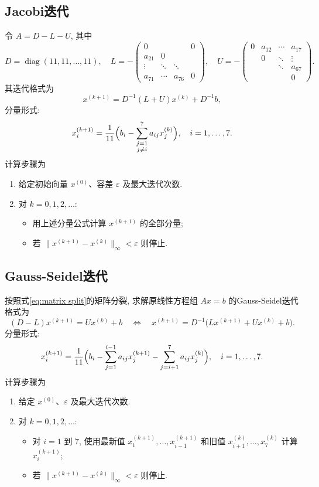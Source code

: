 \documentclass[12pt,a4paper]{ctexart}
\begin{document}
\subsection{Jacobi迭代}
令 $A = D - L - U$, 其中
\begin{equation}\label{eq:matrix split}
    D = \operatorname{diag}(11,11,\dots,11),\quad
    L = -\begin{pmatrix}
    0 &  &  & 0\\
    a_{21} & 0 &  & \\
    \vdots & \ddots & \ddots & \\
    a_{71} & \cdots & a_{76} & 0
    \end{pmatrix},\quad
    U = -\begin{pmatrix}
    0 & a_{12} & \cdots & a_{17}\\
    & 0 & \ddots & \vdots\\
    & & \ddots & a_{67}\\
    & & & 0
\end{pmatrix}.
\end{equation}
其迭代格式为\[
x^{(k+1)} = D^{-1}(L+U)x^{(k)} + D^{-1}b,
\]
分量形式: 
\[
x_i^{(k+1)} = \frac{1}{11}\Bigl(b_i - \sum_{\substack{j=1\\ j\neq i}}^{7} a_{ij}x_j^{(k)}\Bigr), \quad i=1,\dots,7.
\]
计算步骤为\begin{enumerate}
\item 给定初始向量 $x^{(0)}$、容差 $\varepsilon$ 及最大迭代次数. 
\item 对 $k=0,1,2,\dots$: 
   \begin{itemize}
   \item 用上述分量公式计算 $x^{(k+1)}$ 的全部分量; 
   \item 若 $\|x^{(k+1)}-x^{(k)}\|_\infty<\varepsilon$ 则停止. 
   \end{itemize}
\end{enumerate}

\subsection{Gauss-Seidel迭代}
按照式\eqref{eq:matrix split}的矩阵分裂, 求解原线性方程组 $Ax=b$ 的Gauss-Seidel迭代格式为
\[
(D-L)x^{(k+1)} = Ux^{(k)} + b \quad\Longleftrightarrow\quad
x^{(k+1)} = D^{-1}\bigl(L x^{(k+1)} + U x^{(k)} + b\bigr).
\]
分量形式: 
\[
x_i^{(k+1)} = \frac{1}{11}\Bigl(b_i - \sum_{j=1}^{i-1} a_{ij}x_j^{(k+1)} - \sum_{j=i+1}^{7} a_{ij}x_j^{(k)}\Bigr), \quad i=1,\dots,7.
\]
计算步骤为\begin{enumerate}
\item 给定 $x^{(0)}$、$\varepsilon$ 及最大迭代次数. 
\item 对 $k=0,1,2,\dots$: 
   \begin{itemize}
   \item 对 $i=1$ 到 $7$, 使用最新值 $x_1^{(k+1)},\dots,x_{i-1}^{(k+1)}$ 和旧值 $x_{i+1}^{(k)},\dots,x_7^{(k)}$ 计算 $x_i^{(k+1)}$; 
   \item 若 $\|x^{(k+1)}-x^{(k)}\|_\infty<\varepsilon$ 则停止. 
   \end{itemize}
\end{enumerate}
\end{document}
